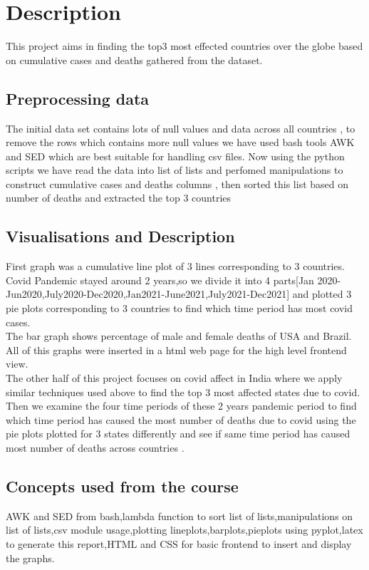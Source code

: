 \chapter{Description}
	This project aims in finding the top3 most effected countries over the globe based on cumulative cases and deaths gathered from the dataset.
\section{Preprocessing data}
The initial data set contains lots of null values and data across all countries , to remove the rows which contains more null values we have used bash tools AWK and SED which are best suitable for handling csv files.
Now using the python scripts we have read the data into list of lists and perfomed manipulations to construct cumulative cases and deaths columns , then sorted this list based on number of deaths and extracted the top 3 countries
\section{Visualisations and Description}
First graph was a cumulative line plot of 3 lines corresponding to 3 countries.
Covid Pandemic stayed around 2 years,so we divide it into 4 parts[Jan 2020-Jun2020,July2020-Dec2020,Jan2021-June2021,July2021-Dec2021] and plotted 3 pie plots corresponding to 3 countries to find which time period has most covid cases.\\
The bar graph shows percentage of male and female deaths of USA and Brazil. \\
All of this graphs were inserted in a html web page for the high level frontend view.\\
The other half of this project focuses on covid affect in India where we apply similar techniques used above to find the top 3 most affected states due to covid.\\
Then we examine the four time periods of these 2 years pandemic period to find which time period has caused the most number of deaths due to covid using the pie plots plotted for 3 states differently and see if same time period has caused most number of deaths across countries .
\section{Concepts used from the course}
AWK and SED from bash,lambda function to sort list of lists,manipulations on list of lists,csv module usage,plotting lineplots,barplots,pieplots using pyplot,latex to generate this report,HTML and CSS for basic frontend to insert and display the graphs.

